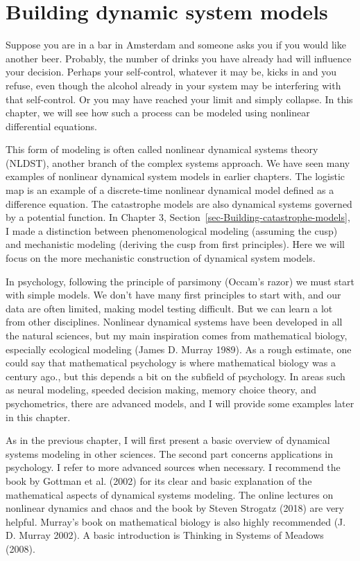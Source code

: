 \documentclass[
  a4paper,
  DIV=11,
  numbers=noendperiod,
  oneside]{scrreprt}
\begin{document}

\hypertarget{sec-ch4n}{%
\chapter{Building dynamic system models}\label{sec-ch4n}}

Suppose you are in a bar in Amsterdam and someone asks you if you would
like another beer. Probably, the number of drinks you have already had
will influence your decision. Perhaps your self-control, whatever it may
be, kicks in and you refuse, even though the alcohol already in your
system may be interfering with that self-control. Or you may have
reached your limit and simply collapse. In this chapter, we will see how
such a process can be modeled using nonlinear differential equations.

This form of modeling is often called nonlinear dynamical systems theory
(NLDST), another branch of the complex systems approach. We have seen
many examples of nonlinear dynamical system models in earlier chapters.
The logistic map is an example of a discrete-time nonlinear dynamical
model defined as a difference equation. The catastrophe models are also
dynamical systems governed by a potential function. In Chapter 3,
Section~\ref{sec-Building-catastrophe-models}, I made a distinction
between phenomenological modeling (assuming the cusp) and mechanistic
modeling (deriving the cusp from first principles). Here we will focus
on the more mechanistic construction of dynamical system models.

In psychology, following the principle of parsimony (Occam's razor) we
must start with simple models. We don't have many first principles to
start with, and our data are often limited, making model testing
difficult. But we can learn a lot from other disciplines. Nonlinear
dynamical systems have been developed in all the natural sciences, but
my main inspiration comes from mathematical biology, especially
ecological modeling (James D. Murray 1989). As a rough estimate, one
could say that mathematical psychology is where mathematical biology was
a century ago., but this depends a bit on the subfield of psychology. In
areas such as neural modeling, speeded decision making, memory choice
theory, and psychometrics, there are advanced models, and I will provide
some examples later in this chapter.

As in the previous chapter, I will first present a basic overview of
dynamical systems modeling in other sciences. The second part concerns
applications in psychology. I refer to more advanced sources when
necessary. I recommend the book by Gottman et al. (2002) for its clear
and basic explanation of the mathematical aspects of dynamical systems
modeling. The online lectures on nonlinear dynamics and chaos and the
book by Steven Strogatz (2018) are very helpful. Murray's book on
mathematical biology is also highly recommended (J. D. Murray 2002). A
basic introduction is Thinking in Systems of Meadows (2008).
\end{document}
